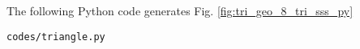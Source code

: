 The  following Python code generates Fig. \ref{fig:tri_geo_8_tri_sss_py}
%
\begin{lstlisting}
codes/triangle.py
\end{lstlisting}
%
%
%
%
